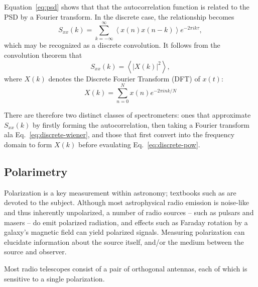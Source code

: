 \documentclass{ws-rv961x669}
\begin{document}
Equation~\ref{eq:psd} shows that that the autocorrelation function is related to the PSD by a Fourier transform. In the discrete case, the relationship becomes
\begin{equation}
S_{xx}(k)=\sum_{k=-\infty}^{\infty}\left\langle x(n)x(n-k)\right\rangle e^{-2\pi ik\tau},\label{eq:discrete-wiener}
\end{equation}
which may be recognized as a discrete convolution. It follows from the convolution theorem that 
\begin{equation}
S_{xx}(k)=\left\langle \left|X(k)\right|^{2}\right\rangle ,\label{eq:discrete-pow}
\end{equation}
where $X(k)$ denotes the Discrete Fourier Transform (DFT) of $x(t)$:
\begin{equation}
X(k)=\sum_{n=0}^{N}x(n)e^{-2\pi ink/N}
\end{equation}

There are therefore two distinct classes of spectrometers: ones that approximate $S_{xx}(k)$ by firstly forming the autocorrelation, then taking a Fourier transform ala Eq.~\ref{eq:discrete-wiener}, and those that first convert into the frequency domain to form $X(k)$ before evaulating Eq.~\ref{eq:discrete-pow}.




\subsection{Polarimetry}

Polarization is a key measurement within astronomy; textbooks such as \citet{BookTinbergenPolarim} are devoted to the subject.  Although most astrophysical radio emission is noise-like and thus inherently unpolarized, a number of radio sources -- such as pulsars and masers -- do emit polarized radiation, and effects such as Faraday rotation by a galaxy's magnetic field can yield polarized signals. Measuring polarization can elucidate information about the source itself, and/or the medium between the source and observer. 

Most radio telescopes consist of a pair of orthogonal antennas, each of which is sensitive to a single polarization. 
\end{document}
